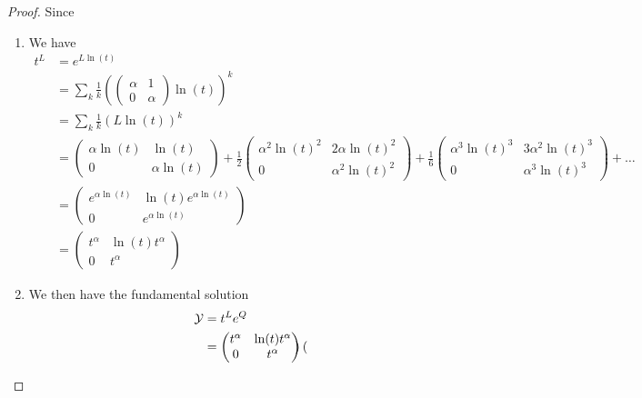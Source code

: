 \begin{proof}
  Since
  \begin{enumerate}
    \item We have
      \begin{align*}
        t^L&=e^{L\ln(t)}
        \\&=\sum_k\frac{1}{k}\left(\begin{pmatrix}
            \alpha & 1 \\ 0 & \alpha
           \end{pmatrix}\ln(t)\right)^k
        \\&=\sum_k\frac{1}{k}\left(L\ln(t)\right)^k
        \\&=
          \begin{pmatrix}
            \alpha\ln(t) & \ln(t) \\ 0 & \alpha\ln(t)
          \end{pmatrix}
          +
          \frac{1}{2}\begin{pmatrix}
            \alpha^2\ln(t)^2 & 2\alpha\ln(t)^2 \\ 0 & \alpha^2\ln(t)^2
          \end{pmatrix}
          +
          \frac{1}{6}\begin{pmatrix}
            \alpha^3\ln(t)^3 & 3\alpha^2\ln(t)^3 \\ 0 & \alpha^3\ln(t)^3
          \end{pmatrix}
          +\dots
        \\&=
          \begin{pmatrix}
            e^{\alpha\ln(t)} & \ln(t)e^{\alpha\ln(t)} \\ 0 & e^{\alpha\ln(t)}
          \end{pmatrix}
        \\&=
          \begin{pmatrix}
            t^\alpha & \ln(t)t^\alpha \\ 0 & t^\alpha
          \end{pmatrix}
      \end{align*}
    \item We then have the fundamental solution
      \begin{align*}
        \mathcal{Y}&=t^Le^Q
        \\&=\begin{pmatrix}
          t^\alpha & \ln(t)t^\alpha \\ 0 & t^\alpha
        \end{pmatrix}
        \begin{pmatrix}

\end{pmatrix}
\end{align*}
\end{enumerate}
\end{proof}
